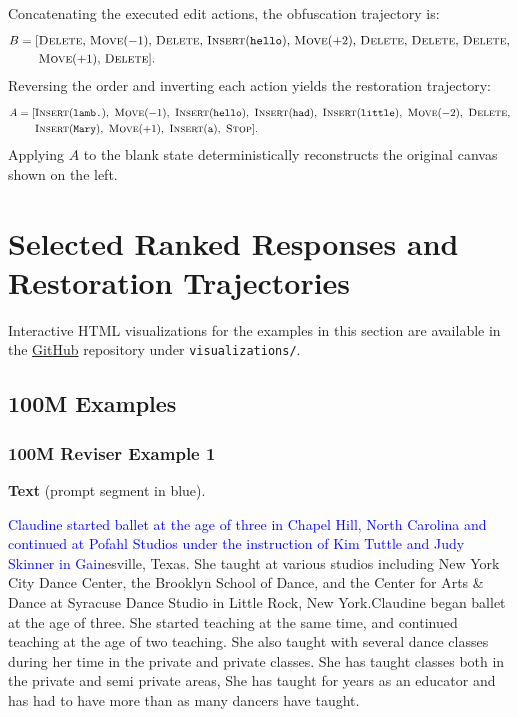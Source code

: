 \documentclass[11pt]{article}
\DeclareRobustCommand{\ph}[1]{#1}
\DeclareRobustCommand{\phA}{A}
\DeclareRobustCommand{\ph}[1]{\ifmmode\text{\phoenicianfont #1}\else{\phoenicianfont #1}\fi}
\DeclareRobustCommand{\phA}{\ph{\char"10900}} %
\DeclareRobustCommand{\ph}[1]{#1}
\DeclareRobustCommand{\phA}{A}
\DeclareRobustCommand{\Stop}{\ifmmode\text{\textsc{Stop}}\else\textsc{Stop}\fi}
\DeclareRobustCommand{\Insert}{\ifmmode\text{\textsc{Insert}}\else\textsc{Insert}\fi}
\DeclareRobustCommand{\Move}{\ifmmode\text{\textsc{Move}}\else\textsc{Move}\fi}
\DeclareRobustCommand{\Delete}{\ifmmode\text{\textsc{Delete}}\else\textsc{Delete}\fi}
\begin{document}
Concatenating the executed edit actions, the obfuscation trajectory is:
\[
B =
\begin{aligned}[t]
[&\Delete,\, \Move(-1),\, \Delete,\, \Insert(\texttt{hello}),\, \Move(+2),\, \Delete,\, \Delete,\, \Delete,\\ &\Move(+1),\, \Delete].
\end{aligned}
\]
Reversing the order and inverting each action yields the restoration trajectory:
\[
\phA =
\begin{aligned}[t]
[&\Insert(\texttt{lamb.}),\ \Move(-1),\ \Insert(\texttt{hello}),\ \Insert(\texttt{had}),\ \Insert(\texttt{little}),\ \Move(-2),\ \Delete, \\ & \Insert(\texttt{Mary}),\ \Move(+1),\ \Insert(\texttt{a}),\ \Stop].
\end{aligned}
\]
Applying $\phA$ to the blank state deterministically reconstructs the original canvas shown on the left.

\section{Selected Ranked Responses and Restoration Trajectories}
\label{sec:appendix_ranked_examples}
Interactive HTML visualizations for the examples in this section are available in the \href{https://github.com/Sean-Diab/Reviser}{GitHub} repository under \texttt{visualizations/}.

\subsection{100M Examples}
\subsubsection*{100M Reviser Example 1}
\textbf{Text} (prompt segment in blue).\par
\ttfamily\small \textcolor{blue}{Claudine started ballet at the age of three in Chapel Hill, North Carolina and continued at Pofahl Studios under the instruction of Kim Tuttle and Judy Skinner in Gain}esville, Texas. She taught at various studios including New York City Dance Center, the Brooklyn School of Dance, and the Center for Arts \& Dance at Syracuse Dance Studio in Little Rock, New York.\newline Claudine began ballet at the age of three. She started teaching at the same time, and continued teaching at the age of two teaching. She also taught with several dance classes during her time in the private and private classes. She has taught classes both in the private and semi private areas, She has taught for years as an educator and has had to have more than as many dancers have taught.
\end{document}
